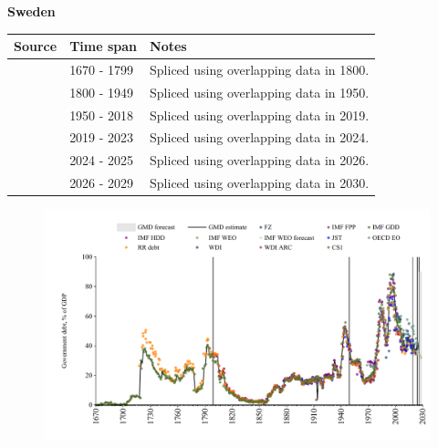 \documentclass[12pt,a4paper,landscape]{article}
\begin{document}
\begin{adjustbox}{max totalsize={\paperwidth}{\paperheight},center}
\begin{minipage}[t][\textheight][t]{\textwidth}
\vspace*{0.5cm}
{}
\begin{center}
{\Large\bfseries Sweden}
\end{center}
\vspace{0.5cm}
\begin{table}[H]
\centering
\small
\begin{tabular}{|l|l|l|}
\hline
\textbf{Source} & \textbf{Time span} & \textbf{Notes} \\
\hline
\rowcolor{white}\cite{CS1_SWE}& 1670 - 1799 &Spliced using overlapping data in 1800.\\
\rowcolor{lightgray}\cite{IMF_FPP}& 1800 - 1949 &Spliced using overlapping data in 1950.\\
\rowcolor{white}\cite{IMF_GDD}& 1950 - 2018 &Spliced using overlapping data in 2019.\\
\rowcolor{lightgray}\cite{IMF_FPP}& 2019 - 2023 &Spliced using overlapping data in 2024.\\
\rowcolor{white}\cite{OECD_EO}& 2024 - 2025 &Spliced using overlapping data in 2026.\\
\rowcolor{lightgray}\cite{IMF_WEO_forecast}& 2026 - 2029 &Spliced using overlapping data in 2030.\\
\hline
\end{tabular}
\end{table}
\begin{figure}[H]
\centering
\includegraphics[width=\textwidth,height=0.6\textheight,keepaspectratio]{graphs/SWE_govdebt_GDP.pdf}
\end{figure}
\end{minipage}
\end{adjustbox}
\end{document}
